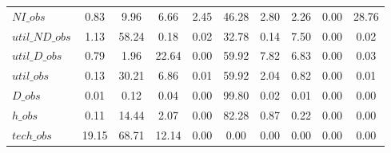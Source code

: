 \begin{center}
\begin{longtable}{lccccccccc}
$NI\_obs        $	 & 	         0.83	 & 	         9.96	 & 	         6.66	 & 	         2.45	 & 	        46.28	 & 	         2.80	 & 	         2.26	 & 	         0.00	 & 	        28.76 \\ 
$util\_ND\_obs  $	 & 	         1.13	 & 	        58.24	 & 	         0.18	 & 	         0.02	 & 	        32.78	 & 	         0.14	 & 	         7.50	 & 	         0.00	 & 	         0.02 \\ 
$util\_D\_obs   $	 & 	         0.79	 & 	         1.96	 & 	        22.64	 & 	         0.00	 & 	        59.92	 & 	         7.82	 & 	         6.83	 & 	         0.00	 & 	         0.03 \\ 
$util\_obs      $	 & 	         0.13	 & 	        30.21	 & 	         6.86	 & 	         0.01	 & 	        59.92	 & 	         2.04	 & 	         0.82	 & 	         0.00	 & 	         0.01 \\ 
$D\_obs         $	 & 	         0.01	 & 	         0.12	 & 	         0.04	 & 	         0.00	 & 	        99.80	 & 	         0.02	 & 	         0.01	 & 	         0.00	 & 	         0.00 \\ 
$h\_obs         $	 & 	         0.11	 & 	        14.44	 & 	         2.07	 & 	         0.00	 & 	        82.28	 & 	         0.87	 & 	         0.22	 & 	         0.00	 & 	         0.00 \\ 
$tech\_obs      $	 & 	        19.15	 & 	        68.71	 & 	        12.14	 & 	         0.00	 & 	         0.00	 & 	         0.00	 & 	         0.00	 & 	         0.00	 & 	         0.00 \\ 
\end{longtable}
 \end{center}
